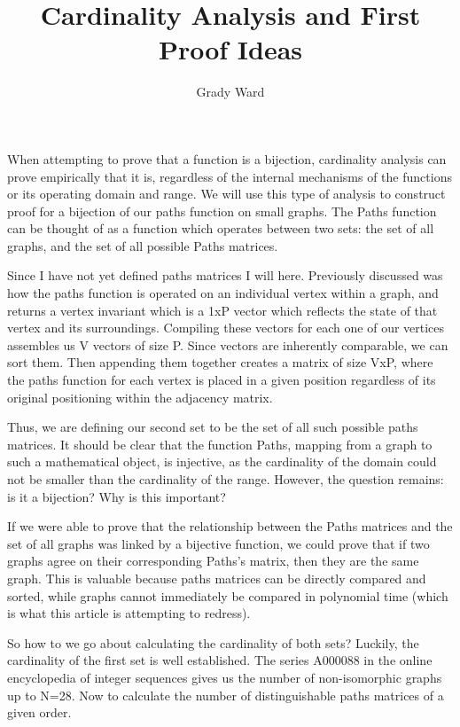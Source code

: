 \documentclass[a4paper,12pt]{article}
\begin{document}
\lstset{language=Python}

\title{Cardinality Analysis and First Proof Ideas}
\author{Grady Ward}

\maketitle

When attempting to prove that a function is a bijection, cardinality analysis can prove empirically that it is, regardless of the internal mechanisms of the functions or its operating domain and range. We will use this type of analysis to construct proof for a bijection of our paths function on small graphs. The Paths function can be thought of as a function which operates between two sets: the set of all graphs, and the set of all possible Paths matrices.  

Since I have not yet defined paths matrices I will here.  Previously discussed was how the paths function is operated on an individual vertex within a graph, and returns a vertex invariant which is a 1xP vector which reflects the state of that vertex and its surroundings.  Compiling these vectors for each one of our vertices assembles us V vectors of size P.  Since vectors are inherently comparable, we can sort them.  Then appending them together creates a matrix of size VxP, where the paths function for each vertex is placed in a given position regardless of its original positioning within the adjacency matrix.

Thus, we are defining our second set to be the set of all such possible paths matrices.  It should be clear that the function Paths, mapping from a graph to such a mathematical object, is injective, as the cardinality of the domain could not be smaller than the cardinality of the range.  However, the question remains: is it a bijection? Why is this important?

If we were able to prove that the relationship between the Paths matrices and the set of all graphs was linked by a bijective function, we could prove that if two graphs agree on their corresponding Paths's matrix, then they are the same graph. This is valuable because paths matrices can be directly compared and sorted, while graphs cannot immediately be compared in polynomial time (which is what this article is attempting to redress).

So how to we go about calculating the cardinality of both sets?  Luckily, the cardinality of the first set is well established.  The series A000088 in the online encyclopedia of integer sequences gives us the number of non-isomorphic graphs up to N=28.  Now to calculate the number of distinguishable paths matrices of a given order.
\end{document}
